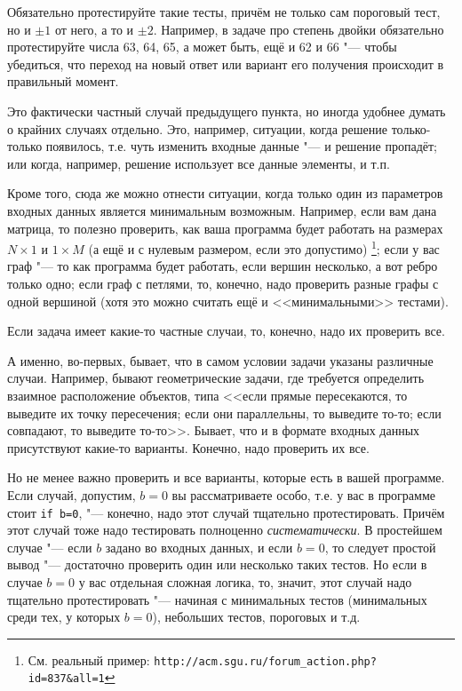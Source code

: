 \documentclass[a4paper,10pt]{problems}
\begin{document}
Обязательно протестируйте такие тесты, причём не только сам пороговый тест, но и $\pm 1$ от него, а то и $\pm 2$. 
Например, в задаче про степень двойки обязательно протестируйте числа 63, 64, 65, а может быть, ещё и 62 и 66 "--- 
чтобы убедиться, что переход на новый ответ или вариант его получения происходит в правильный момент.

Это фактически частный случай предыдущего пункта, но иногда удобнее думать о крайних случаях отдельно. 
Это, например, ситуации, когда решение только-только появилось, т.е. чуть изменить входные данные "--- и решение пропадёт; или когда, например,
решение использует все данные элементы, и т.п.

Кроме того, сюда же можно отнести ситуации, когда только один из параметров входных данных является минимальным возможным. 
Например, если вам дана матрица, то полезно проверить, как ваша программа будет работать на размерах $N\times 1$ и $1\times M$ 
(а ещё и с нулевым размером, если это допустимо)%
\footnote{См. реальный пример: \texttt{http://acm.sgu.ru/forum\_action.php?id=837\&all=1}}; 
если у вас граф "--- то как программа будет работать, если вершин несколько, а вот ребро только одно;
если граф с петлями, то, конечно, надо проверить разные графы с одной вершиной (хотя это можно считать ещё и <<минимальными>> тестами).

Если задача имеет какие-то частные случаи, то, конечно, надо их проверить все. 

А именно, во-первых, бывает, что в самом условии задачи указаны различные случаи.
Например, бывают геометрические задачи, где требуется определить взаимное расположение объектов, 
типа <<если прямые пересекаются, то выведите их точку пересечения;
если они параллельны, то выведите то-то; если совпадают, то выведите то-то>>. 
Бывает, что и в формате входных данных присутствуют какие-то варианты.
Конечно, надо проверить их все.

Но не менее важно проверить и все варианты, которые есть в вашей программе. Если случай, допустим, $b=0$ вы рассматриваете особо, 
т.е. у вас в программе стоит \verb`if b=0`, "--- конечно, надо этот случай тщательно протестировать. 
Причём этот случай тоже надо тестировать полноценно \textit{систематически}. 
В простейшем случае "--- если $b$ задано во входных данных, и если $b=0$, то следует простой вывод "--- достаточно проверить один или несколько таких тестов.
Но если в случае $b=0$ у вас отдельная сложная логика, то, значит, этот случай надо тщательно протестировать "--- начиная с минимальных тестов 
(минимальных среди тех, у которых $b=0$), небольших тестов, пороговых и т.д.
\end{document}
